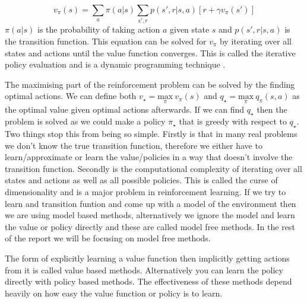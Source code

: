 \begin{equation}
v_{\pi}(s)=\sum_{a}\pi(a|s)\sum_{s',r}p(s',r|s,a)\left[ r+\gamma v_{\pi}(s') \right]
\end{equation}
$\pi(a|s)$ is the probability of taking action $a$ given state $s$ and $p(s',r|s,a)$ is the transition function. This equation can be solved for $v_{\pi}$ by iterating over all states and actions until the value function converges. This is called the iterative policy evaluation and is a dynamic programming technique \cite{bellmanDynamicProgramming1957}.

The maximising part of the reinforcement problem can be solved by the finding optimal actions. We can define both $v_{\star}=\underset{ \pi }{ \text{max} }\ v_{\pi}(s)$ and $q_{\star}=\underset{ \pi }{ \text{max} }\ q_{\pi}(s,a)$ as the optimal value given optimal actions afterwards.
If we can find $q_{\star}$ then the problem is solved as we could make a policy $\pi_{\star}$ that is greedy with respect to $q_{\star}$. Two things stop this from being so simple. Firstly is that in many real problems we don't know the true transition function, therefore we either have to learn/approximate or learn the value/policies in a way that doesn't involve the transition function. Secondly is the computational complexity of iterating over all states and actions as well as all possible policies. This is called the curse of dimensionality and is a major problem in reinforcement learning. If we try to learn and transition funtion and come up with a model of the environment then we are using model based methods, alternatively we ignore the model and learn the value or policy directly and these are called model free methods. In the rest of the report we will be focusing on model free methods.

The form of explicitly learning a value function then implicitly getting actions from it is called value based methods. Alternatively you can learn the policy directly with policy based methods. The effectiveness of these methods depend heavily on how easy the value function or policy is to learn.